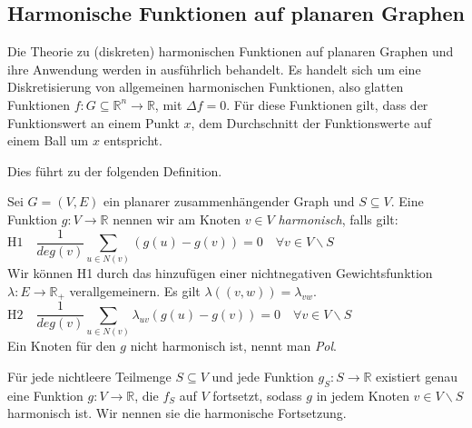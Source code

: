 \subsection{Harmonische Funktionen auf planaren Graphen}

Die Theorie zu (diskreten) harmonischen Funktionen auf planaren Graphen und ihre Anwendung werden in \cite{lov99} ausführlich behandelt. Es handelt sich um eine Diskretisierung von allgemeinen harmonischen Funktionen, also glatten Funktionen $f:G\subseteq \mathbb{R}^n \to \mathbb{R}$, mit $\Delta f = 0$. Für diese Funktionen gilt, dass der Funktionswert an einem Punkt $x$, dem Durchschnitt der Funktionswerte auf einem Ball um $x$ entspricht. 

Dies führt zu der folgenden Definition.

\begin{definition}
Sei $G=(V,E)$ ein planarer zusammenhängender Graph und $S \subseteq V$. Eine Funktion $g:V \to \mathbb{R}$ nennen wir am Knoten $v \in V$ \textit{harmonisch}, falls gilt:
$$ \text{H1} \quad \frac{1}{deg(v)} \sum_{u \in N(v)}(g(u) - g(v)) = 0 \quad \forall v \in V \backslash S \qquad\qquad\qquad\qquad\qquad\qquad\quad\:\,\:$$
Wir können H1 durch das hinzufügen einer nichtnegativen Gewichtsfunktion $\lambda:E\to\mathbb{R}_+$ verallgemeinern. Es gilt $\lambda((v,w)) = \lambda_{vw}$.
$$ \text{H2}\quad\frac{1}{deg(v)} \sum_{u \in N(v)}\lambda_{uv}(g(u) - g(v)) = 0 \quad \forall v \in V \backslash S \qquad\qquad\qquad\qquad\qquad\qquad$$
Ein Knoten für den $g$ nicht harmonisch ist, nennt man \textit{Pol}.
\end{definition}

\begin{theorem}\cite[Theorem 3.1.2]{lov99}\label{harmonic_uni}
Für jede nichtleere Teilmenge $S \subseteq V$ und jede Funktion $g_S:S\to\mathbb{R}$ existiert genau eine Funktion $g:V\to\mathbb{R}$, die $f_S$ auf $V$ fortsetzt, sodass $g$ in jedem Knoten $v\in V \backslash S$ harmonisch ist. Wir nennen sie die \textup{harmonische Fortsetzung}.
\end{theorem}

